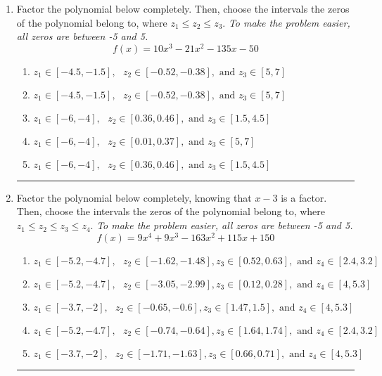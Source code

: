 \documentclass[14pt]{extbook}
\newcommand{\litem}[1]{\item#1\hspace*{-1cm}\rule{\textwidth}{0.4pt}}
\begin{document}
\begin{enumerate}
{\begin{enumerate}[label=\Alph*.]
\end{enumerate} }
\litem{
Factor the polynomial below completely. Then, choose the intervals the zeros of the polynomial belong to, where $z_1 \leq z_2 \leq z_3$. \textit{To make the problem easier, all zeros are between -5 and 5.}\[ f(x) = 10x^{3} -21 x^{2} -135 x -50 \]\begin{enumerate}[label=\Alph*.]
\item \( z_1 \in [-4.5, -1.5], \text{   }  z_2 \in [-0.52, -0.38], \text{   and   } z_3 \in [5, 7] \)
\item \( z_1 \in [-4.5, -1.5], \text{   }  z_2 \in [-0.52, -0.38], \text{   and   } z_3 \in [5, 7] \)
\item \( z_1 \in [-6, -4], \text{   }  z_2 \in [0.36, 0.46], \text{   and   } z_3 \in [1.5, 4.5] \)
\item \( z_1 \in [-6, -4], \text{   }  z_2 \in [0.01, 0.37], \text{   and   } z_3 \in [5, 7] \)
\item \( z_1 \in [-6, -4], \text{   }  z_2 \in [0.36, 0.46], \text{   and   } z_3 \in [1.5, 4.5] \)

\end{enumerate} }
\litem{
Factor the polynomial below completely, knowing that $x -3$ is a factor. Then, choose the intervals the zeros of the polynomial belong to, where $z_1 \leq z_2 \leq z_3 \leq z_4$. \textit{To make the problem easier, all zeros are between -5 and 5.}\[ f(x) = 9x^{4} +9 x^{3} -163 x^{2} +115 x + 150 \]\begin{enumerate}[label=\Alph*.]
\item \( z_1 \in [-5.2, -4.7], \text{   }  z_2 \in [-1.62, -1.48], z_3 \in [0.52, 0.63], \text{   and   } z_4 \in [2.4, 3.2] \)
\item \( z_1 \in [-5.2, -4.7], \text{   }  z_2 \in [-3.05, -2.99], z_3 \in [0.12, 0.28], \text{   and   } z_4 \in [4, 5.3] \)
\item \( z_1 \in [-3.7, -2], \text{   }  z_2 \in [-0.65, -0.6], z_3 \in [1.47, 1.5], \text{   and   } z_4 \in [4, 5.3] \)
\item \( z_1 \in [-5.2, -4.7], \text{   }  z_2 \in [-0.74, -0.64], z_3 \in [1.64, 1.74], \text{   and   } z_4 \in [2.4, 3.2] \)
\item \( z_1 \in [-3.7, -2], \text{   }  z_2 \in [-1.71, -1.63], z_3 \in [0.66, 0.71], \text{   and   } z_4 \in [4, 5.3] \)


\end{enumerate}}
\end{enumerate}
\end{document}
